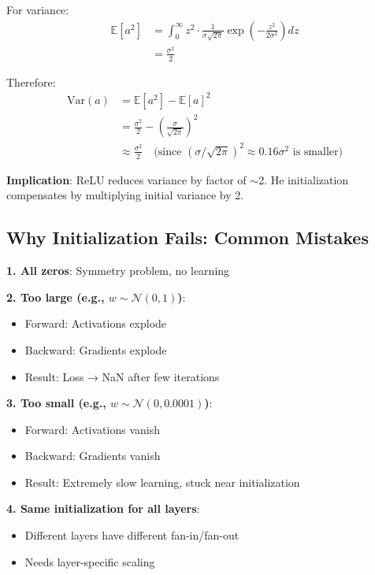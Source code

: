\documentclass[11pt,oneside]{book}
\begin{document}
For variance:
\begin{align*}
\mathbb{E}[a^2] &= \int_0^\infty z^2 \cdot \frac{1}{\sigma\sqrt{2\pi}} \exp\left(-\frac{z^2}{2\sigma^2}\right) dz \\
&= \frac{\sigma^2}{2}
\end{align*}

Therefore:
\begin{align*}
\text{Var}(a) &= \mathbb{E}[a^2] - \mathbb{E}[a]^2 \\
&= \frac{\sigma^2}{2} - \left(\frac{\sigma}{\sqrt{2\pi}}\right)^2 \\
&\approx \frac{\sigma^2}{2} \quad \text{(since } (\sigma/\sqrt{2\pi})^2 \approx 0.16\sigma^2 \text{ is smaller)}
\end{align*}

\textbf{Implication}: ReLU reduces variance by factor of $\sim$2. He initialization compensates by multiplying initial variance by 2.

\subsection{Why Initialization Fails: Common Mistakes}

\textbf{1. All zeros}: Symmetry problem, no learning

\textbf{2. Too large (e.g., $w \sim \mathcal{N}(0, 1)$)}:
\begin{itemize}
\item Forward: Activations explode
\item Backward: Gradients explode
\item Result: Loss → NaN after few iterations
\end{itemize}

\textbf{3. Too small (e.g., $w \sim \mathcal{N}(0, 0.0001)$)}:
\begin{itemize}
\item Forward: Activations vanish
\item Backward: Gradients vanish
\item Result: Extremely slow learning, stuck near initialization
\end{itemize}

\textbf{4. Same initialization for all layers}:
\begin{itemize}
\item Different layers have different fan-in/fan-out
\item Needs layer-specific scaling
\end{itemize}
\end{document}
